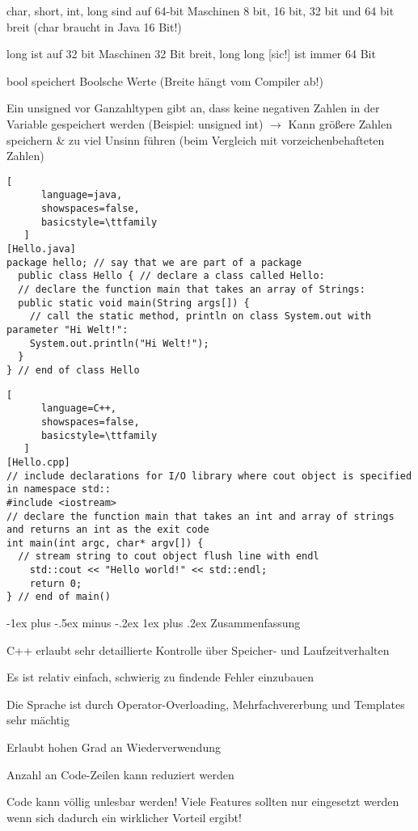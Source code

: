 \documentclass[10pt]{article}
\makeatletter
\renewcommand{\subsubsection}{\@startsection{subsubsection}{3}{0mm}%
                                {-1ex plus -.5ex minus -.2ex}%
                                {1ex plus .2ex}%
                                {\normalfont\small\bfseries}}
\makeatother
\begin{document}
\begin{itemize*}
\begin{itemize*}
    \item char, short, int, long sind auf 64-bit Maschinen 8 bit, 16 bit, 32 bit und 64 bit breit (char braucht in Java 16 Bit!)
    \item long ist auf 32 bit Maschinen 32 Bit breit, long long [sic!] ist immer 64 Bit
    \item bool speichert Boolsche Werte (Breite hängt vom Compiler ab!)
    \item Ein unsigned vor Ganzahltypen gibt an, dass keine negativen Zahlen in der Variable gespeichert werden (Beispiel: unsigned int) $\rightarrow$ Kann größere Zahlen speichern \& zu viel Unsinn führen (beim Vergleich mit vorzeichenbehafteten Zahlen)
  \end{itemize*}
\end{itemize*}

\begin{lstlisting}[
      language=java,
      showspaces=false,
      basicstyle=\ttfamily
   ]
[Hello.java] 
package hello; // say that we are part of a package
  public class Hello { // declare a class called Hello:
  // declare the function main that takes an array of Strings:
  public static void main(String args[]) {
    // call the static method, println on class System.out with parameter "Hi Welt!":
    System.out.println("Hi Welt!");
  }
} // end of class Hello
\end{lstlisting}

\begin{lstlisting}[
      language=C++,
      showspaces=false,
      basicstyle=\ttfamily
   ]
[Hello.cpp]
// include declarations for I/O library where cout object is specified in namespace std::
#include <iostream>
// declare the function main that takes an int and array of strings and returns an int as the exit code
int main(int argc, char* argv[]) {
  // stream string to cout object flush line with endl
    std::cout << "Hello world!" << std::endl;
    return 0;
} // end of main()
\end{lstlisting}

\subsubsection{Zusammenfassung}
\begin{itemize*}
  \item C++ erlaubt sehr detaillierte Kontrolle über Speicher- und Laufzeitverhalten
  \item Es ist relativ einfach, schwierig zu findende Fehler einzubauen
  \item Die Sprache ist durch Operator-Overloading, Mehrfachvererbung und Templates sehr mächtig
  \item Erlaubt hohen Grad an Wiederverwendung
  \item Anzahl an Code-Zeilen kann reduziert werden
  \item Code kann völlig unlesbar werden! Viele Features sollten nur eingesetzt werden wenn sich dadurch ein wirklicher Vorteil ergibt!
\end{itemize*}
\end{document}
